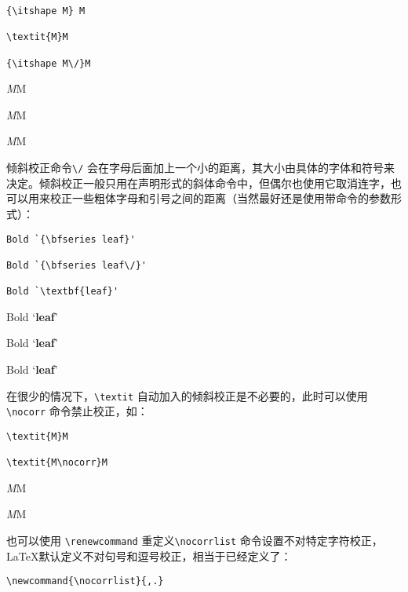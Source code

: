 \begin{minipage}[t]{0.45\textwidth}
\begin{lstlisting}
{\itshape M} M

\textit{M}M

{\itshape M\/}M
\end{lstlisting}
\end{minipage}
\hfill
\begin{minipage}[t]{0.45\textwidth}
    {\itshape M}M

    \textit{M}M
    
    {\itshape M\/}M
\end{minipage}
倾斜校正命令\verb|\/| 会在字母后面加上一个小的距离，其大小由具体的字体和符号来决定。倾斜校正一般只用在声明形式的斜体命令中，但偶尔也使用它取消连字，也可以用来校正一些粗体字母和引号之间的距离（当然最好还是使用带命令的参数形式）：

\begin{minipage}[t]{0.45\textwidth}
\begin{lstlisting}
Bold `{\bfseries leaf}'

Bold `{\bfseries leaf\/}'

Bold `\textbf{leaf}'
\end{lstlisting}
\end{minipage}
\hfill
\begin{minipage}[t]{0.45\textwidth}
Bold `{\bfseries leaf}'

Bold `{\bfseries leaf\/}'

Bold `\textbf{leaf}'
\end{minipage}

在很少的情况下，\verb|\textit| 自动加入的倾斜校正是不必要的，此时可以使用\verb|\nocorr| 命令禁止校正，如：

\begin{minipage}[t]{0.45\textwidth}
\begin{lstlisting}
\textit{M}M

\textit{M\nocorr}M
\end{lstlisting}
\end{minipage}
\hfill
\begin{minipage}[t]{0.45\textwidth}
    \textit{M}M

    \textit{M\nocorr}M
\end{minipage}

也可以使用 \verb|\renewcommand| 重定义\verb|\nocorrlist| 命令设置不对特定字符校正，\LaTeX 默认定义不对句号和逗号校正，相当于已经定义了：
\begin{lstlisting}
\newcommand{\nocorrlist}{,.}
\end{lstlisting}


